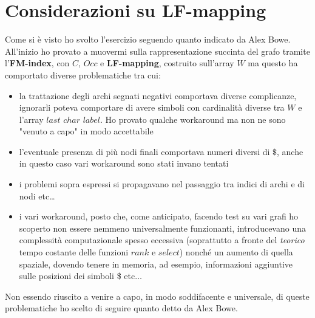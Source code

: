 \documentclass[a4paper,12pt, oneside]{book}
\begin{document}
\section{Considerazioni su LF-mapping}
Come si è visto ho svolto l'esercizio seguendo quanto indicato da Alex Bowe. \\
All'inizio ho provato a muovermi sulla rappresentazione succinta del grafo
tramite l'\textbf{FM-index}, con $C$, $Occ$ e \textbf{LF-mapping}, costruito
sull'array $W$ ma questo ha comportato diverse problematiche tra cui:
\begin{itemize}
  \item la trattazione degli archi segnati negativi comportava diverse
  complicanze, ignorarli poteva comportare di avere simboli con cardinalità
  diverse tra $W$ e l'array $last$ $char$ $label$. Ho provato qualche workaround
  ma non ne sono "venuto a capo" in modo accettabile
  \item l'eventuale presenza di più nodi finali comportava numeri diversi di
  $\$$, anche in questo caso vari workaround sono stati invano tentati
  \item i problemi sopra espressi si propagavano nel passaggio tra indici di
  archi e di nodi etc\ldots
  \item i vari workaround, posto che, come anticipato, facendo test su vari
  grafi ho scoperto non essere nemmeno universalmente funzionanti, introducevano
  una complessità computazionale spesso eccessiva (soprattutto a fronte del
  \textit{teorico} tempo costante delle funzioni $rank$ e $select$) nonché un
  aumento di quella spaziale, dovendo tenere in memoria, ad esempio,
  informazioni aggiuntive sulle posizioni dei simboli \$ etc$\ldots$
\end{itemize}
Non essendo riuscito a venire a capo, in modo soddifacente e universale, di
queste problematiche ho scelto di seguire quanto detto da Alex Bowe.
\end{document}
